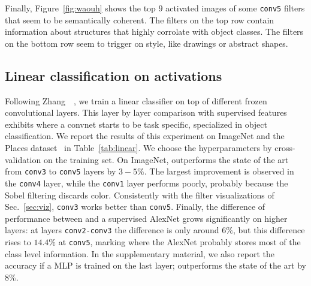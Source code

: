 Finally, Figure~\ref{fig:waouh} shows the top $9$ activated images of some \texttt{conv5} filters that seem to be semantically coherent.
The filters on the top row contain information about structures that highly corrolate with object classes.
The filters on the bottom row seem to trigger on style, like drawings or abstract shapes.



\subsection{Linear classification on activations}
\label{sec:linear}

Following Zhang~\etal~\cite{zhang2016split}, we train a linear classifier on top of different frozen convolutional layers.
This layer by layer comparison with supervised features exhibits where a convnet starts to be task specific, \ie specialized in object classification.
We report the results of this experiment on ImageNet and the Places dataset~\cite{zhou2014learning} in Table~\ref{tab:linear}.
We choose the hyperparameters by cross-validation on the training set.
On ImageNet, \OURS outperforms the state of the art from \texttt{conv3} to \texttt{conv5} layers by $3-5\%$.
The largest improvement is observed in the \texttt{conv4} layer, while the \texttt{conv1} layer performs poorly,
probably because the Sobel filtering discards color.
Consistently with the filter visualizations of Sec.~\ref{sec:viz}, \texttt{conv3} works better than \texttt{conv5}.
Finally, the difference of performance between \OURS and a supervised AlexNet grows significantly on higher layers:
at layers \texttt{conv2-conv3} the difference is only around $6\%$, %
but this difference rises to $14.4\%$ at \texttt{conv5}, marking where the AlexNet probably stores most of the class level information.
In the supplementary material, we also report the accuracy if a MLP is trained on the last layer; \OURS outperforms the state of the art by $8\%$.

